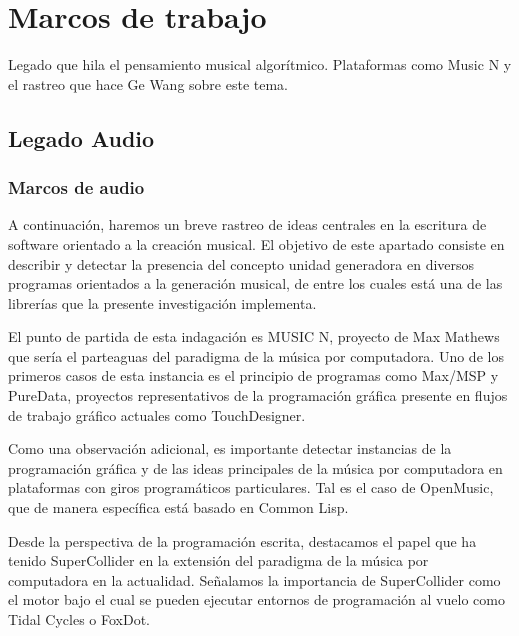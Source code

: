 
\chapter{Marcos de trabajo}



Legado que hila el pensamiento musical algorítmico. Plataformas como Music N y el rastreo que hace Ge Wang sobre este tema.

\section{Legado Audio}

\subsection{Marcos de audio}

A continuación, haremos un breve rastreo de ideas centrales en la escritura de software orientado a la creación musical. El objetivo de este apartado consiste en describir y detectar la presencia del concepto unidad generadora en diversos programas orientados a la generación musical, de entre los cuales está una de las librerías que la presente investigación implementa.

El punto de partida de esta indagación es MUSIC N, proyecto de Max Mathews que sería el parteaguas del paradigma de la música por computadora. Uno de los primeros casos de esta instancia es el principio de programas como Max/MSP y PureData, proyectos representativos de la programación gráfica presente en flujos de trabajo gráfico actuales como TouchDesigner.

Como una observación adicional, es importante detectar instancias de la programación gráfica y de las ideas principales de la música por computadora en plataformas con giros programáticos particulares. Tal es el caso de OpenMusic, que de manera específica está basado en Common Lisp.

Desde la perspectiva de la programación escrita, destacamos el papel que ha tenido SuperCollider en la extensión del paradigma de la música por computadora en la actualidad. Señalamos la importancia de SuperCollider como el motor bajo el cual se pueden ejecutar entornos de programación al vuelo como Tidal Cycles o FoxDot. 

